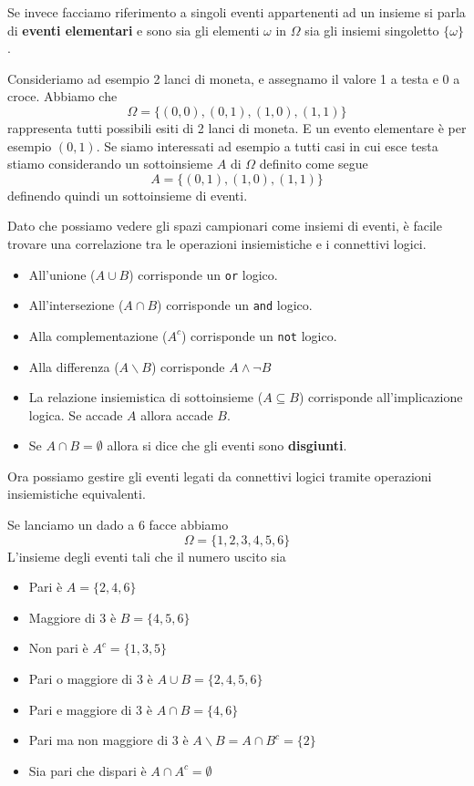 Se invece facciamo riferimento a singoli eventi appartenenti ad un insieme si parla di
\textbf{eventi elementari} e sono sia gli elementi $\omega$ in $\Omega$ sia gli insiemi singoletto
$\{\omega\}$.

\begin{example}
	Consideriamo ad esempio 2 lanci di moneta, e assegnamo il valore 1 a testa e 0 a croce. Abbiamo
	che
	\[ \Omega = \{ (0,0), (0,1), (1,0), (1,1) \} \]
	rappresenta tutti possibili esiti di 2 lanci di moneta. E un evento elementare è per esempio
	$(0,1)$. Se siamo interessati ad esempio a tutti casi in cui esce testa stiamo considerando un
	sottoinsieme $A$ di $\Omega$ definito come segue
	\[ A = \{ (0,1), (1,0), (1,1) \} \]
	definendo quindi un sottoinsieme di eventi.
\end{example}

Dato che possiamo vedere gli spazi campionari come insiemi di eventi, è facile trovare una
correlazione tra le operazioni insiemistiche e i connettivi logici.
\begin{itemize}
	\item All'unione ($A \cup B$) corrisponde un \verb|or| logico.
	\item All'intersezione ($A \cap B$) corrisponde un \verb|and| logico.
	\item Alla complementazione ($A^c$) corrisponde un \verb|not| logico.
	\item Alla differenza ($A \backslash B$) corrisponde $A \land \lnot B$
	\item La relazione insiemistica di sottoinsieme ($A \subseteq B$) corrisponde
	      all'implicazione logica. Se accade $A$ allora accade $B$.
	\item Se $A \cap B = \emptyset$ allora si dice che gli eventi sono \textbf{disgiunti}.
\end{itemize}
Ora possiamo gestire gli eventi legati da connettivi logici tramite operazioni insiemistiche
equivalenti.

\begin{example}
	Se lanciamo un dado a 6 facce abbiamo
	\[ \Omega = \{ 1, 2, 3, 4, 5, 6 \} \]
	L'insieme degli eventi tali che il numero uscito sia
	\begin{itemize}
		\item Pari è $A = \{ 2, 4, 6 \}$
		\item Maggiore di 3 è $B = \{ 4, 5, 6 \}$
		\item Non pari è $A^c = \{ 1, 3, 5 \}$
		\item Pari o maggiore di 3 è $A \cup B = \{ 2, 4, 5, 6 \}$
		\item Pari e maggiore di 3 è $A \cap B = \{ 4, 6 \}$
		\item Pari ma non maggiore di 3 è $A \backslash B = A \cap B^c = \{2\}$
		\item Sia pari che dispari è $A \cap A^c = \emptyset$
	\end{itemize}
\end{example}


